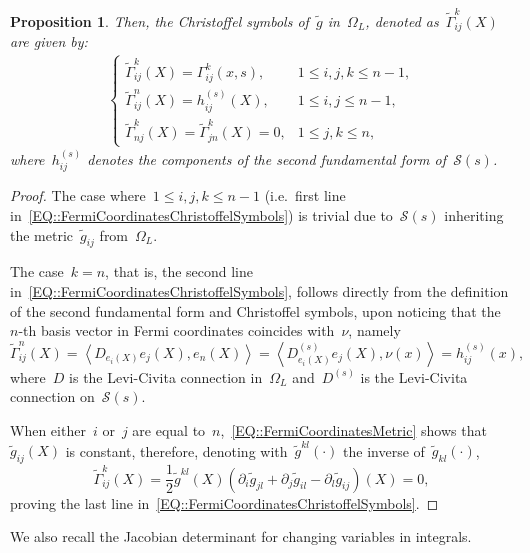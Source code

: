 \documentclass[12pt,a4paper]{amsart}
\numberwithin{equation}{section}
\newtheorem{proposition}[theorem]{Proposition}
\theoremstyle{definition}
\theoremstyle{remark}
\newcommand{\dotprod}[2]{\left\langle#1,#2\right\rangle}
\renewcommand{\leq}{\leqslant}
\begin{document}
\begin{appendix}
\begin{proposition}
    Then, the Christoffel symbols of~$\tilde{g}$ in~$\Omega_L$, denoted as~$\tilde{\Gamma}_{ij}^k(X)$ are given by:
    \begin{align}
        \begin{cases}\label{EQ::FermiCoordinatesChristoffelSymbols}
            \tilde{\Gamma}_{ij}^k(X) = \Gamma_{ij}^{k}(x,s),&1\leq i,j,k \leq n-1,\\
            \tilde{\Gamma}_{ij}^n(X) = h^{(s)}_{ij}(X),&1\leq i,j \leq n-1,\\
            \tilde{\Gamma}_{nj}^k(X) = \tilde{\Gamma}_{jn}^k(X) = 0,&1\leq j,k \leq n,
        \end{cases}
    \end{align}
    where~$h^{(s)}_{ij}$ denotes the components of the second fundamental form of~$\mathcal{S}(s)$.
\end{proposition}

\begin{proof}
    The case where~$1\leq i,j,k \leq n-1$ (i.e.~first line in~\eqref{EQ::FermiCoordinatesChristoffelSymbols}) is trivial due to~$\mathcal{S}(s)$ inheriting the metric~$\tilde{g}_{ij}$ from~$\Omega_L$.

    The case~$k = n$, that is, the second line in~\eqref{EQ::FermiCoordinatesChristoffelSymbols}, follows directly from the definition of the second fundamental form and Christoffel symbols, upon noticing that the~$n$-th basis vector in Fermi coordinates coincides with~$\nu$, namely
    \begin{equation}
        \tilde{\Gamma}_{ij}^n(X) = \dotprod{D_{e_i(X)}e_j(X)}{e_n(X)} = \dotprod{D^{(s)}_{e_i(X)}e_j(X)}{\nu(x)} = h^{(s)}_{ij}(x),
    \end{equation}
    where~$D$ is the Levi-Civita connection in~$\Omega_L$ and~$D^{(s)}$ is the Levi-Civita connection on~$\mathcal{S}(s)$.

    When either~$i$ or~$j$ are equal to~$n$,~\eqref{EQ::FermiCoordinatesMetric} shows that~$\tilde{g}_{ij}(X)$ is constant, therefore, denoting with~$\tilde{g}^{kl}(\cdot)$ the inverse of~$\tilde{g}_{kl}(\cdot)$,
    \begin{equation}
        \tilde{\Gamma}_{ij}^k(X) = \frac{1}{2} \tilde{g}^{kl}(X) \left( \partial_i \tilde{g}_{jl} + \partial_j \tilde{g}_{il} - \partial_l \tilde{g}_{ij} \right)(X) = 0,
    \end{equation}
    proving the last line in~\eqref{EQ::FermiCoordinatesChristoffelSymbols}.
\end{proof}

We also recall the Jacobian determinant for changing variables in integrals.


\end{appendix}
\end{document}
